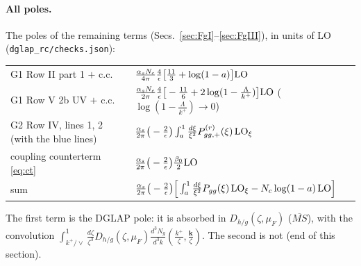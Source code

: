 \documentclass[10pt]{article}
\numberwithin{equation}{section}
\begin{document}
\paragraph{All poles.} The poles of the remaining terms (Secs.~\ref{sec:FgI}--\ref{sec:FgIII}), in units of LO (\texttt{dglap\_rc/checks.json}):
\begin{center}\small
\begin{tabular}{@{}ll@{}}\hline
G1 Row II part 1 $+$ c.c. & $\frac{\alpha_sN_c}{4\pi}\frac{4}{\epsilon}\big[\frac{11}{3}+\log(1-a)\big]{\rm LO}$\\
G1 Row V 2b UV $+$ c.c. & $\frac{\alpha_sN_c}{2\pi}\frac{4}{\epsilon}\big[-\frac{11}{6}+2\log(1-\frac{\Lambda}{k^+})\big]{\rm LO}$ \quad($\log(1-\frac{\Lambda}{k^+})\to0$)\\
G2 Row IV, lines 1, 2 (with the blue lines) & $\frac{\alpha_s}{2\pi}\big(-\frac{2}{\epsilon}\big)\int_a^1\frac{d\xi}{\xi^2}P^{(r)}_{gg,+}(\xi)\,{\rm LO}_\xi$\\
coupling counterterm \eqref{eq:ct} & $\frac{\alpha_s}{2\pi}\big(-\frac{2}{\epsilon}\big)\frac{\beta_0}{2}{\rm LO}$\\\hline
sum & $\frac{\alpha_s}{2\pi}\big(-\frac{2}{\epsilon}\big)\Big[\int_a^1\frac{d\xi}{\xi^2}P_{gg}(\xi)\,{\rm LO}_\xi-N_c\log(1-a)\,{\rm LO}\Big]$\\\hline
\end{tabular}
\end{center}
The first term is the DGLAP pole: it is absorbed in $D_{h/g}(\zeta,\mu_F)$ ($\overline{MS}$), with the convolution $\int_{k^+/\vee}^1\frac{d\zeta}{\zeta^3}D_{h/g}(\zeta,\mu_F)\frac{d^3N_g}{d^3k}(\frac{k^+}{\zeta},\frac{\mathbf k}{\zeta})$. The second is not (end of this section).
\end{document}
